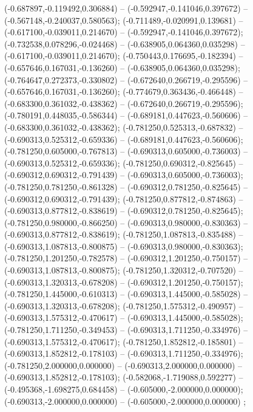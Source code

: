  (-0.687897,-0.119492,0.306884) -- (-0.592947,-0.141046,0.397672) -- (-0.567148,-0.240037,0.580563);
 (-0.711489,-0.020991,0.139681) -- (-0.617100,-0.039011,0.214670) -- (-0.592947,-0.141046,0.397672);
 (-0.732538,0.078296,-0.024468) -- (-0.638905,0.064360,0.035298) -- (-0.617100,-0.039011,0.214670);
 (-0.750443,0.176695,-0.182394) -- (-0.657646,0.167031,-0.136260) -- (-0.638905,0.064360,0.035298);
 (-0.764647,0.272373,-0.330802) -- (-0.672640,0.266719,-0.295596) -- (-0.657646,0.167031,-0.136260);
 (-0.774679,0.363436,-0.466448) -- (-0.683300,0.361032,-0.438362) -- (-0.672640,0.266719,-0.295596);
 (-0.780191,0.448035,-0.586344) -- (-0.689181,0.447623,-0.560606) -- (-0.683300,0.361032,-0.438362);
 (-0.781250,0.525313,-0.687832) -- (-0.690313,0.525312,-0.659336) -- (-0.689181,0.447623,-0.560606);
 (-0.781250,0.605000,-0.767813) -- (-0.690313,0.605000,-0.736003) -- (-0.690313,0.525312,-0.659336);
 (-0.781250,0.690312,-0.825645) -- (-0.690312,0.690312,-0.791439) -- (-0.690313,0.605000,-0.736003);
 (-0.781250,0.781250,-0.861328) -- (-0.690312,0.781250,-0.825645) -- (-0.690312,0.690312,-0.791439);
 (-0.781250,0.877812,-0.874863) -- (-0.690313,0.877812,-0.838619) -- (-0.690312,0.781250,-0.825645);
 (-0.781250,0.980000,-0.866250) -- (-0.690313,0.980000,-0.830363) -- (-0.690313,0.877812,-0.838619);
 (-0.781250,1.087813,-0.835488) -- (-0.690313,1.087813,-0.800875) -- (-0.690313,0.980000,-0.830363);
 (-0.781250,1.201250,-0.782578) -- (-0.690312,1.201250,-0.750157) -- (-0.690313,1.087813,-0.800875);
 (-0.781250,1.320312,-0.707520) -- (-0.690313,1.320313,-0.678208) -- (-0.690312,1.201250,-0.750157);
 (-0.781250,1.445000,-0.610313) -- (-0.690313,1.445000,-0.585028) -- (-0.690313,1.320313,-0.678208);
 (-0.781250,1.575312,-0.490957) -- (-0.690313,1.575312,-0.470617) -- (-0.690313,1.445000,-0.585028);
 (-0.781250,1.711250,-0.349453) -- (-0.690313,1.711250,-0.334976) -- (-0.690313,1.575312,-0.470617);
 (-0.781250,1.852812,-0.185801) -- (-0.690313,1.852812,-0.178103) -- (-0.690313,1.711250,-0.334976);
 (-0.781250,2.000000,0.000000) -- (-0.690313,2.000000,0.000000) -- (-0.690313,1.852812,-0.178103);
 (-0.582068,-1.719088,0.592277) -- (-0.495368,-1.698275,0.684458) -- (-0.605000,-2.000000,0.000000);
 (-0.690313,-2.000000,0.000000) -- (-0.605000,-2.000000,0.000000) ;
